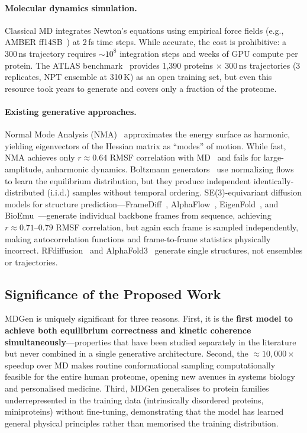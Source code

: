 \documentclass[12pt,letterpaper]{article}
\begin{document}
\paragraph{Molecular dynamics simulation.}
Classical MD integrates Newton's equations using empirical force fields (e.g., AMBER ff14SB~\cite{maier2015ff14sb}) at 2\,fs time steps. While accurate, the cost is prohibitive: a 300\,ns trajectory requires $\sim\!10^8$ integration steps and weeks of GPU compute per protein. The ATLAS benchmark~\cite{vander2024atlas} provides 1,390 proteins $\times$ 300\,ns trajectories (3 replicates, NPT ensemble at 310\,K) as an open training set, but even this resource took years to generate and covers only a fraction of the proteome.

\paragraph{Existing generative approaches.}
Normal Mode Analysis (NMA)~\cite{brooks1983harmonic,go1983dynamics} approximates the energy surface as harmonic, yielding eigenvectors of the Hessian matrix as ``modes'' of motion. While fast, NMA achieves only $r\approx0.64$ RMSF correlation with MD~\cite{yang2007oasis} and fails for large-amplitude, anharmonic dynamics. Boltzmann generators~\cite{noe2019boltzmann} use normalizing flows to learn the equilibrium distribution, but they produce independent identically-distributed (i.i.d.) samples without temporal ordering. SE(3)-equivariant diffusion models for structure prediction—FrameDiff~\cite{yim2023framediff}, AlphaFlow~\cite{jing2024alphaflow}, EigenFold~\cite{lu2023eigenfold}, and BioEmu~\cite{lewis2024bioemu}—generate individual backbone frames from sequence, achieving $r\approx0.71$--$0.79$ RMSF correlation, but again each frame is sampled independently, making autocorrelation functions and frame-to-frame statistics physically incorrect. RFdiffusion~\cite{watson2023novo} and AlphaFold3~\cite{abramson2024accurate} generate single structures, not ensembles or trajectories.

\subsection*{Significance of the Proposed Work}

MDGen is uniquely significant for three reasons. First, it is the \textbf{first model to achieve both equilibrium correctness and kinetic coherence simultaneously}—properties that have been studied separately in the literature but never combined in a single generative architecture. Second, the $\approx\!10{,}000\times$ speedup over MD makes routine conformational sampling computationally feasible for the entire human proteome, opening new avenues in systems biology and personalised medicine. Third, MDGen generalises to protein families underrepresented in the training data (intrinsically disordered proteins, miniproteins) without fine-tuning, demonstrating that the model has learned general physical principles rather than memorised the training distribution.
\end{document}
